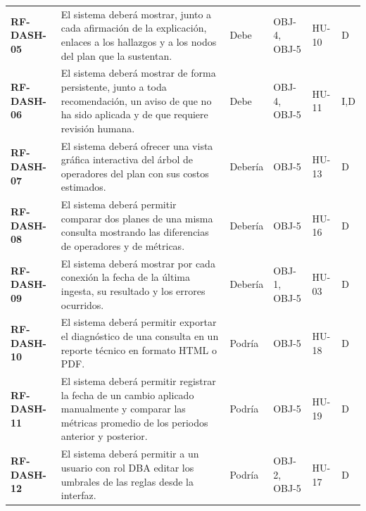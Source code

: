 \documentclass[11pt,a4paper]{report}
\begin{document}
\begin{footnotesize}
\begin{xltabular}{\linewidth}{@{}p{1.7cm}Xp{1.1cm}p{1.3cm}p{1.6cm}p{0.9cm}@{}}
\textbf{RF-DASH-05} & El sistema deberá mostrar, junto a cada afirmación de la explicación, enlaces a los hallazgos y a los nodos del plan que la sustentan. & Debe & OBJ-4, OBJ-5 & HU-10 & D \\
\textbf{RF-DASH-06} & El sistema deberá mostrar de forma persistente, junto a toda recomendación, un aviso de que no ha sido aplicada y de que requiere revisión humana. & Debe & OBJ-4, OBJ-5 & HU-11 & I,D \\
\textbf{RF-DASH-07} & El sistema deberá ofrecer una vista gráfica interactiva del árbol de operadores del plan con sus costos estimados. & Debería & OBJ-5 & HU-13 & D \\
\textbf{RF-DASH-08} & El sistema deberá permitir comparar dos planes de una misma consulta mostrando las diferencias de operadores y de métricas. & Debería & OBJ-5 & HU-16 & D \\
\textbf{RF-DASH-09} & El sistema deberá mostrar por cada conexión la fecha de la última ingesta, su resultado y los errores ocurridos. & Debería & OBJ-1, OBJ-5 & HU-03 & D \\
\textbf{RF-DASH-10} & El sistema deberá permitir exportar el diagnóstico de una consulta en un reporte técnico en formato HTML o PDF. & Podría & OBJ-5 & HU-18 & D \\
\textbf{RF-DASH-11} & El sistema deberá permitir registrar la fecha de un cambio aplicado manualmente y comparar las métricas promedio de los periodos anterior y posterior. & Podría & OBJ-5 & HU-19 & D \\
\textbf{RF-DASH-12} & El sistema deberá permitir a un usuario con rol DBA editar los umbrales de las reglas desde la interfaz. & Podría & OBJ-2, OBJ-5 & HU-17 & D \\
\end{xltabular}
\end{footnotesize}
\end{document}
